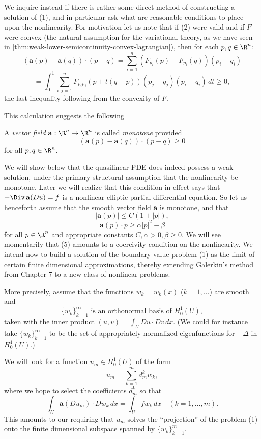 We inquire instead if there is rather some direct method of constructing a solution of (1), and in particular ask what are reasonable conditions to place upon the nonlinearity. For motivation let us note that if (2) were valid and if $F$ were convex (the natural assumption for the variational theory, as we have seen in \cref{thm:weak-lower-semicontinuity-convex-lagrangian}), then for each $p, q \in \R^n$:
\[
(\mathbf{a}(p) - \mathbf{a}(q)) \cdot (p - q) = \sum_{i=1}^n (F_{p_i}(p) - F_{p_i}(q))(p_i - q_i)
\]
\[
= \int_0^1 \sum_{i,j=1}^n F_{p_i p_j}(p + t(q-p))(p_j - q_j)(p_i - q_i) \, dt \geq 0,
\]
the last inequality following from the convexity of $F$.

This calculation suggests the following

\begin{definition}
\label{def:monotone-vector-field}
A \textit{vector field} $\mathbf{a} : \R^n \to \R^n$ is called \textit{monotone} provided
\[
(\mathbf{a}(p) - \mathbf{a}(q)) \cdot (p - q) \geq 0
\tag{3}
\]
for all $p, q \in \R^n$.
\end{definition}

We will show below that the quasilinear PDE does indeed possess a weak solution, under the primary structural assumption that the nonlinearity be monotone. Later we will realize that this condition in effect says that $-\Div\,\mathbf{a}(Du) = f$ is a nonlinear elliptic partial differential equation. So let us henceforth assume that the smooth vector field $\mathbf{a}$ is monotone, and that
\[
|\mathbf{a}(p)| \leq C(1 + |p|),
\tag{4}
\]
\[
\mathbf{a}(p) \cdot p \geq \alpha|p|^2 - \beta
\tag{5}
\]
for all $p \in \R^n$ and appropriate constants $C, \alpha > 0, \beta \geq 0$. We will see momentarily that (5) amounts to a coercivity condition on the nonlinearity. We intend now to build a solution of the boundary-value problem (1) as the limit of certain finite dimensional approximations, thereby extending Galerkin's method from Chapter 7 to a new class of nonlinear problems.

More precisely, assume that the functions $w_k = w_k(x)$ ($k = 1, \ldots$) are smooth and
\[
\{w_k\}_{k=1}^{\infty} \text{ is an orthonormal basis of } H_0^1(U),
\]
taken with the inner product $(u,v) = \int_U Du \cdot Dv\, dx$. (We could for instance take $\{w_k\}_{k=1}^{\infty}$ to be the set of appropriately normalized eigenfunctions for $-\Delta$ in $H_0^1(U)$.)

We will look for a function $u_m \in H_0^1(U)$ of the form
\[
u_m = \sum_{k=1}^m d_m^k w_k,
\tag{6}
\]
where we hope to select the coefficients $d_m^k$ so that
\[
\int_U \mathbf{a}(Du_m) \cdot Dw_k\, dx = \int_U f w_k\, dx \quad (k = 1, \ldots, m).
\tag{7}
\]
This amounts to our requiring that $u_m$ solves the ``projection'' of the problem (1) onto the finite dimensional subspace spanned by $\{w_k\}_{k=1}^m$.

